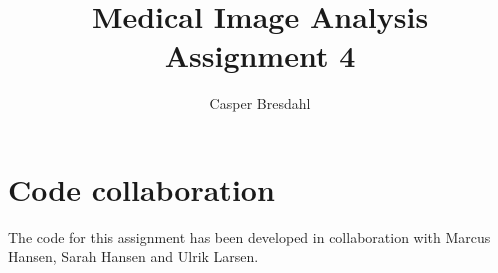 \documentclass[runningheads]{llncs}
\begin{document}
%
\title{Medical Image Analysis Assignment 4}
%
%
\author{Casper Bresdahl}
%
%
%
\maketitle              %
%






\newpage
%
%
%
% 
% 
%
%
%
\section{Code collaboration}
The code for this assignment has been developed in collaboration with Marcus Hansen, Sarah Hansen and Ulrik Larsen.
\end{document}
